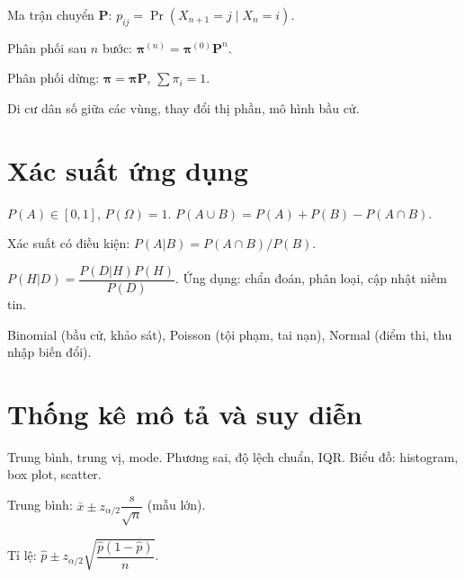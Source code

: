 \documentclass[12pt,a4paper]{article}
\begin{document}
\begin{dinhnghia}[title={Xích Markov rời rạc}]
  Ma trận chuyển $\mathbf{P}$: $p_{ij} = \Pr(X_{n+1} = j \mid X_n = i)$.

  Phân phối sau $n$ bước: $\boldsymbol{\pi}^{(n)} = \boldsymbol{\pi}^{(0)}\mathbf{P}^n$.

  Phân phối dừng: $\boldsymbol{\pi} = \boldsymbol{\pi}\mathbf{P}$, $\sum \pi_i = 1$.
\end{dinhnghia}

\begin{vidu}[title={Ứng dụng}]
  Di cư dân số giữa các vùng, thay đổi thị phần, mô hình bầu cử.
\end{vidu}

\section{Xác suất ứng dụng}

\begin{dinhnghia}[title={Xác suất cơ bản}]
  $P(A) \in [0,1]$, $P(\Omega) = 1$. $P(A \cup B) = P(A) + P(B) - P(A \cap B)$.

  Xác suất có điều kiện: $P(A|B) = P(A \cap B)/P(B)$.
\end{dinhnghia}

\begin{dinhly}[title={Bayes}]
  $P(H|D) = \dfrac{P(D|H)P(H)}{P(D)}$. Ứng dụng: chẩn đoán, phân loại, cập nhật niềm tin.
\end{dinhly}

\begin{dinhnghia}[title={Phân phối phổ biến}]
  Binomial (bầu cử, khảo sát), Poisson (tội phạm, tai nạn), Normal (điểm thi, thu nhập biến đổi).
\end{dinhnghia}

\section{Thống kê mô tả và suy diễn}

\begin{phuongphap}[title={Mô tả dữ liệu}]
  Trung bình, trung vị, mode. Phương sai, độ lệch chuẩn, IQR. Biểu đồ: histogram, box plot, scatter.
\end{phuongphap}

\begin{phuongphap}[title={Khoảng tin cậy}]
  Trung bình: $\bar{x} \pm z_{\alpha/2}\dfrac{s}{\sqrt{n}}$ (mẫu lớn).

  Tỉ lệ: $\hat{p} \pm z_{\alpha/2}\sqrt{\dfrac{\hat{p}(1-\hat{p})}{n}}$.
\end{phuongphap}
\end{document}
